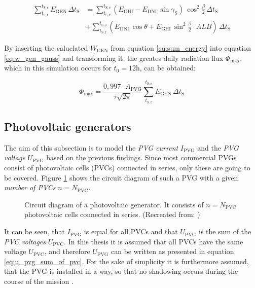 \begin{center}
	\begin{equation} \label{eq:sum_e_gen}
		\begin{aligned}
		\displaystyle\sum_{t_{\mathrm{S,r}}}^{t_{\mathrm{S,s}}} E_{\mathrm{GEN}} \, \Delta t_{\mathrm{S}} &= \displaystyle\sum_{t_{\mathrm{S,r}}}^{t_{\mathrm{S,s}}} \left(E_{\mathrm{GHI}} - E_{\mathrm{DNI}} \, \sin \gamma_{\mathrm{S}} \right) \, \cos^2 \frac{\beta}{2} \, \Delta t_{\mathrm{S}} \\
		&+ \displaystyle\sum_{t_{\mathrm{S,r}}}^{t_{\mathrm{S,s}}} \left(E_{\mathrm{DNI}} \, \cos \theta + E_{\mathrm{GHI}} \, \sin^2 \frac{\beta}{2} \cdot ALB\right) \, \Delta t_{\mathrm{S}}
		\end{aligned}
	\end{equation}
\end{center}

By inserting the caluclated $W_{\mathrm{GEN}}$ from equation \ref{eq:sum_energy} into equation \ref{eq:w_gen_gauss} and transforming it, the greates daily radiation flux $\Phi_{\mathrm{max}}$, which in this simulation occurs for $t_0 = 12\mathrm{h}$, can be obtained:

\begin{center}
	\begin{equation} \label{eq:phi_max_sum}
		\Phi_{\mathrm{max}} = \frac{0,997 \cdot A_{\mathrm{PVG}}}{\tau \sqrt{2\pi}} \displaystyle\sum_{t_{\mathrm{S,r}}}^{t_{\mathrm{S,s}}} E_{\mathrm{GEN}} \, \Delta t_{\mathrm{S}}
	\end{equation}
\end{center}

%
%
%


\subsection{Photovoltaic generators} \label{sec:photovoltaic_generators}
The aim of this subsection is to model the \emph{PVG current} $I_{\mathrm{PVG}}$ and the \emph{PVG voltage} $U_{\mathrm{PVG}}$ based on the previous findings. Since most commercial PVGs consist of photovoltaic cells (PVCs) connected in series, only these are going to be covered. Figure \ref{fig:tikz_PVG_circuit_diagram} shows the circuit diagram of such a PVG with a given \emph{number of PVCs} $n = N_{\mathrm{PVC}}$.
\begin{figure}[h!]
	\centering
	
	\caption{Circuit diagram of a photovoltaic generator. It consists of $n = N_{\mathrm{PVC}}$ photovoltaic cells connected in series. (Recreated from: \cite{Mertens:2015})}
	\label{fig:tikz_PVG_circuit_diagram}
\end{figure}
It can be seen, that $I_{\mathrm{PVG}}$ is equal for all PVCs and that $U_{\mathrm{PVG}}$ is the sum of the \emph{PVC voltages} $U_{\mathrm{PVC}}$. In this thesis it is assumed that all PVCs have the same voltage $U_{\mathrm{PVC}}$, and therefore $U_{\mathrm{PVG}}$ can be written as presented in equation \ref{eq:u_pvg_sum_of_pvc}. For the sake of simplicity it is furthermore assumed, that the PVG is installed in a way, so that no shadowing occurs during the course of the mission \cite{Prechtl:2006, Mertens:2015}.

